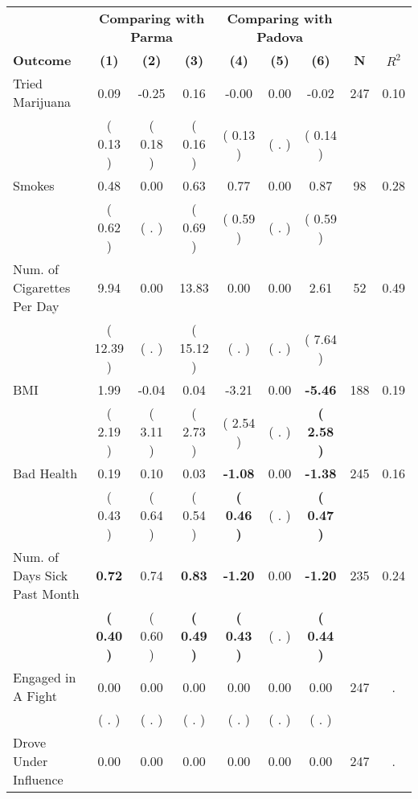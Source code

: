 \begin{tabular}{lcccccccc}
\toprule
 & \multicolumn{3}{c}{\textbf{Comparing with Parma}} & \multicolumn{3}{c}{\textbf{Comparing with Padova}} & \\
\cmidrule(lr){2-4} \cmidrule(lr){5-7} 
 \textbf{Outcome} & \textbf{(1)} & \textbf{(2)} & \textbf{(3)} & \textbf{(4)} & \textbf{(5)} & \textbf{(6)} & \textbf{N} & \textbf{$ R^2$} \\
\midrule
Tried Marijuana &      0.09 &     -0.25 &      0.16 &     -0.00 &      0.00 &     -0.02 & 247 &       0.10 \\ 
 & (     0.13 ) & (     0.18 ) & (     0.16 ) & (     0.13 ) & (        . ) & (     0.14 ) & \\
Smokes &      0.48 &      0.00 &      0.63 &      0.77 &      0.00 &      0.87 & 98 &       0.28 \\ 
 & (     0.62 ) & (        . ) & (     0.69 ) & (     0.59 ) & (        . ) & (     0.59 ) & \\
Num. of Cigarettes Per Day &      9.94 &      0.00 &     13.83 &      0.00 &      0.00 &      2.61 & 52 &       0.49 \\ 
 & (    12.39 ) & (        . ) & (    15.12 ) & (        . ) & (        . ) & (     7.64 ) & \\
BMI &      1.99 &     -0.04 &      0.04 &     -3.21 &      0.00 & \textbf{    -5.46} & 188 &       0.19 \\ 
 & (     2.19 ) & (     3.11 ) & (     2.73 ) & (     2.54 ) & (        . ) & \textbf{(     2.58 )} & \\
Bad Health &      0.19 &      0.10 &      0.03 & \textbf{    -1.08} &      0.00 & \textbf{    -1.38} & 245 &       0.16 \\ 
 & (     0.43 ) & (     0.64 ) & (     0.54 ) & \textbf{(     0.46 )} & (        . ) & \textbf{(     0.47 )} & \\
Num. of Days Sick Past Month & \textbf{     0.72} &      0.74 & \textbf{     0.83} & \textbf{    -1.20} &      0.00 & \textbf{    -1.20} & 235 &       0.24 \\ 
 & \textbf{(     0.40 )} & (     0.60 ) & \textbf{(     0.49 )} & \textbf{(     0.43 )} & (        . ) & \textbf{(     0.44 )} & \\
Engaged in A Fight &      0.00 &      0.00 &      0.00 &      0.00 &      0.00 &      0.00 & 247 &          . \\ 
 & (        . ) & (        . ) & (        . ) & (        . ) & (        . ) & (        . ) & \\
Drove Under Influence &      0.00 &      0.00 &      0.00 &      0.00 &      0.00 &      0.00 & 247 &          . \\ 

\end{tabular}
